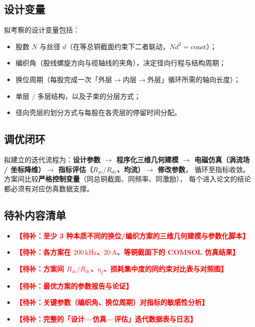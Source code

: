 \documentclass[12pt, a4paper]{ctexart}
\newcommand{\Rac}{R_{\mathrm{ac}}}
\newcommand{\Rdc}{R_{\mathrm{dc}}}
\newcommand{\todo}[1]{\textcolor{red}{\textbf{【待补：#1】}}}
\newcommand{\U}[1]{\ensuremath{\,\mathrm{#1}}}
\begin{document}
\subsection{设计变量}

拟考察的设计变量包括：

\begin{itemize}[leftmargin=2em, itemsep=2pt]
\item 股数 $N$ 与丝径 $d$（在等总铜截面约束下二者联动，$N d^2 = \text{const}$）；
\item 编织角（股线螺旋方向与缆轴线的夹角），决定径向行程与结构周期；
\item 换位周期（每股完成一次「外层$\to$内层$\to$外层」循环所需的轴向长度）；
\item 单层 / 多层结构，以及子束的分层方式；
\item 径向壳层的划分方式与每股在各壳层的停留时间分配。
\end{itemize}

\subsection{调优闭环}

拟建立的迭代流程为：\textbf{设计参数 $\to$ 程序化三维几何建模 $\to$
电磁仿真（涡流场 / 坐标降维）$\to$ 指标评估（$\Rac/\Rdc$、均流）$\to$ 修改参数}，
循环至指标收敛。方案间比较\textbf{严格控制变量}（同总铜截面、同频率、同激励），
每个进入论文的结论都必须有对应仿真数据支撑。

\subsection{待补内容清单}

\begin{itemize}[leftmargin=2em, itemsep=2pt]
\item \todo{至少 3 种本质不同的换位/编织方案的三维几何建模与参数化脚本}
\item \todo{各方案在 $200\U{kHz}$、$20\U{A}$、等铜截面下的 COMSOL 仿真结果}
\item \todo{方案间 $\Rac/\Rdc$、$\eta_I$、损耗集中度的同约束对比表与对照图}
\item \todo{最优方案的参数报告与论证}
\item \todo{关键参数（编织角、换位周期）对指标的敏感性分析}
\item \todo{完整的「设计—仿真—评估」迭代数据表与日志}
\end{itemize}

\end{document}
